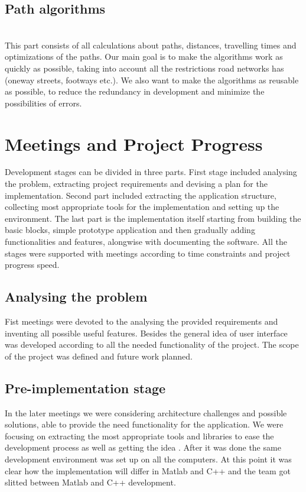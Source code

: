 \documentclass[reqno,openany,12pt]{amsbook}
\theoremstyle{definition}
\theoremstyle{remark}
\begin{document}
\subsection{Path algorithms}\hspace*{\fill} \\
This part consists of all calculations about paths, distances, travelling times and optimizations of the paths. Our main goal is to make the algorithms work as quickly as possible, taking into account all the restrictions road networks has (oneway streets, footways etc.). We also want to make the algorithms as reusable as possible, to reduce the redundancy in development and minimize the possibilities of errors.
\section{Meetings and Project Progress}

Development stages can be divided in three parts. First stage included analysing the problem, extracting project requirements and devising a plan for the implementation. Second part included extracting the application structure, collecting most appropriate tools for the implementation and setting up the environment. The last part is the implementation itself starting from building the basic blocks, simple prototype application and then gradually adding functionalities and features, alongwise with documenting the software. All the stages were supported with meetings according to time constraints and project progress speed.

\subsection{Analysing the problem}
Fist meetings were devoted to the analysing the provided requirements and inventing all possible useful features. Besides the general idea of user interface was developed according to all the needed functionality of the project. The scope of the project was defined and future work planned.

\subsection{Pre-implementation stage}
In the later meetings we were considering architecture challenges and possible solutions, able to provide the need functionality for the application. We were focusing on extracting the most appropriate tools and libraries to ease the development process as well as getting the idea . After it was done the same development environment was set up on all the computers. At this point it was clear how the implementation will differ in Matlab and C++ and the team got slitted between Matlab and C++ development.
\end{document}
